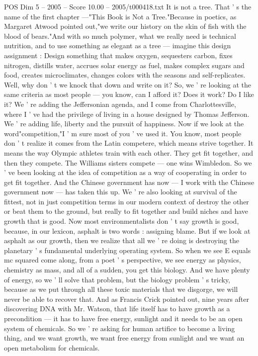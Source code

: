 \begin{textsample}{POS Dim 5 – 2005 – Score 10.00 – 2005/t000418.txt}
It is not a tree.
That ' s the name of the first chapter —"This Book is Not a Tree."Because in poetics, as Margaret Atwood pointed out,"we write our history on the skin of fish with the blood of bears."And with so much polymer, what we really need is technical nutrition, and to use something as elegant as a tree — imagine this design assignment : Design something that makes oxygen, sequesters carbon, fixes nitrogen, distills water, accrues solar energy as fuel, makes complex sugars and food, creates microclimates, changes colors with the seasons and self-replicates.
Well, why don ' t we knock that down and write on it?
So, we ' re looking at the same criteria as most people — you know, can I afford it?
Does it work?
Do I like it?
We ' re adding the Jeffersonian agenda, and I come from Charlottesville, where I ' ve had the privilege of living in a house designed by Thomas Jefferson.
We ' re adding life, liberty and the pursuit of happiness.
Now if we look at the word"competition,"I ' m sure most of you ' ve used it.
You know, most people don ' t realize it comes from the Latin competere, which means strive together.
It means the way Olympic athletes train with each other.
They get fit together, and then they compete.
The Williams sisters compete — one wins Wimbledon.
So we ' ve been looking at the idea of competition as a way of cooperating in order to get fit together.
And the Chinese government has now — I work with the Chinese government now — has taken this up.
We ' re also looking at survival of the fittest, not in just competition terms in our modern context of destroy the other or beat them to the ground, but really to fit together and build niches and have growth that is good.
Now most environmentalists don ' t say growth is good, because, in our lexicon, asphalt is two words : assigning blame.
But if we look at asphalt as our growth, then we realize that all we ' re doing is destroying the planetary ' s fundamental underlying operating system.
So when we see E equals mc squared come along, from a poet ' s perspective, we see energy as physics, chemistry as mass, and all of a sudden, you get this biology.
And we have plenty of energy, so we ' ll solve that problem, but the biology problem ' s tricky, because as we put through all these toxic materials that we disgorge, we will never be able to recover that.
And as Francis Crick pointed out, nine years after discovering DNA with Mr.
Watson, that life itself has to have growth as a precondition — it has to have free energy, sunlight and it needs to be an open system of chemicals.
So we ' re asking for human artifice to become a living thing, and we want growth, we want free energy from sunlight and we want an open metabolism for chemicals.

\end{textsample}
